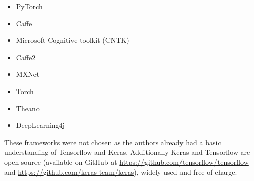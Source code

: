 \begin{itemize}
	\item PyTorch
	\item Caffe
	\item Microsoft Cognitive toolkit (CNTK)
	\item Caffe2
	\item MXNet
	\item Torch
	\item Theano
	\item DeepLearning4j
\end{itemize}

These frameworks were not chosen as the authors already had a basic understanding of Tensorflow and Keras. Additionally Keras and Tensorflow are open source (available on GitHub at \url{https://github.com/tensorflow/tensorflow} and \url{https://github.com/keras-team/keras}), widely used and free of charge.

\filbreak
